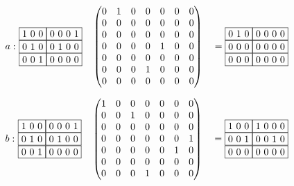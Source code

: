 \begin{example}
\begin{alignat*}{7}
  a:\,\,
  & \begin{matrix}
    \fbox{1 0 0} \fbox{0 0 0 1} \\ 
    \fbox{0 1 0} \fbox{0 1 0 0} \\
    \fbox{0 0 1} \fbox{0 0 0 0}
      \end{matrix}  && \begin{pmatrix}
      0 & 1 & 0 & 0 & 0 & 0 & 0 \\
      0 & 0 & 0 & 0 & 0 & 0 & 0 \\
      0 & 0 & 0 & 0 & 0 & 0 & 0 \\
      0 & 0 & 0 & 0 & 1 & 0 & 0 \\
      0 & 0 & 0 & 0 & 0 & 0 & 0 \\
      0 & 0 & 0 & 1 & 0 & 0 & 0 \\
      0 & 0 & 0 & 0 & 0 & 0 & 0  
      \end{pmatrix} &&= \begin{matrix}
        \fbox{0 1 0} \fbox{0 0 0 0} \\ 
        \fbox{0 0 0} \fbox{0 0 0 0} \\
        \fbox{0 0 0} \fbox{0 0 0 0}
    \end{matrix}
\end{alignat*}
  
\begin{alignat*}{7}
  b:\,\,
  & \begin{matrix}
    \fbox{1 0 0} \fbox{0 0 0 1} \\ 
    \fbox{0 1 0} \fbox{0 1 0 0} \\
    \fbox{0 0 1} \fbox{0 0 0 0}
      \end{matrix}  && \begin{pmatrix}
      1 & 0 & 0 & 0 & 0 & 0 & 0 \\
      0 & 0 & 1 & 0 & 0 & 0 & 0 \\
      0 & 0 & 0 & 0 & 0 & 0 & 0 \\
      0 & 0 & 0 & 0 & 0 & 0 & 1 \\
      0 & 0 & 0 & 0 & 0 & 1 & 0 \\
      0 & 0 & 0 & 0 & 0 & 0 & 0 \\
      0 & 0 & 0 & 1 & 0 & 0 & 0
      \end{pmatrix} &&= \begin{matrix}
        \fbox{1 0 0} \fbox{1 0 0 0} \\ 
        \fbox{0 0 1} \fbox{0 0 1 0} \\
        \fbox{0 0 0} \fbox{0 0 0 0}
    \end{matrix}
\end{alignat*}


\end{example}
